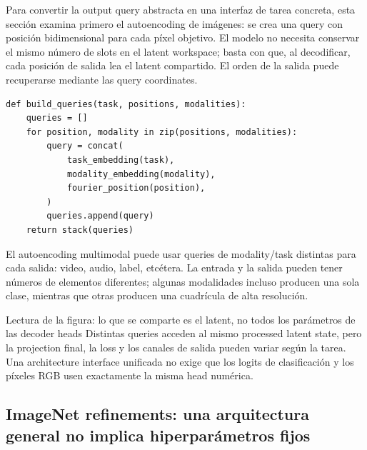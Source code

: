 Para convertir la output query abstracta en una interfaz de tarea concreta, esta sección examina primero el autoencoding de imágenes: se crea una query con posición bidimensional para cada píxel objetivo. El modelo no necesita conservar el mismo número de slots en el latent workspace; basta con que, al decodificar, cada posición de salida lea el latent compartido. El orden de la salida puede recuperarse mediante las query coordinates.


\begin{lstlisting}[caption={Pseudocódigo conceptual de la construcción de output queries por tarea.}]
def build_queries(task, positions, modalities):
    queries = []
    for position, modality in zip(positions, modalities):
        query = concat(
            task_embedding(task),
            modality_embedding(modality),
            fourier_position(position),
        )
        queries.append(query)
    return stack(queries)
\end{lstlisting}

El autoencoding multimodal puede usar queries de modality/task distintas para cada salida: video, audio, label, etcétera. La entrada y la salida pueden tener números de elementos diferentes; algunas modalidades incluso producen una sola clase, mientras que otras producen una cuadrícula de alta resolución.


\begin{knowledgebox}{Lectura de la figura: lo que se comparte es el latent, no todos los parámetros de las decoder heads}
Distintas queries acceden al mismo processed latent state, pero la projection final, la loss y los canales de salida pueden variar según la tarea. Una architecture interface unificada no exige que los logits de clasificación y los píxeles RGB usen exactamente la misma head numérica.
\end{knowledgebox}

\subsection{ImageNet refinements: una arquitectura general no implica hiperparámetros fijos}

